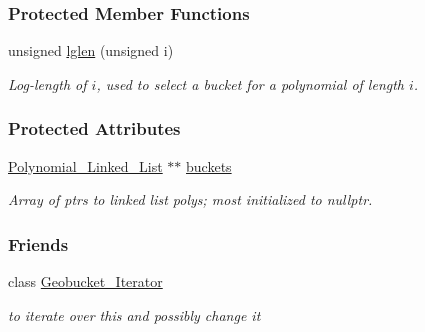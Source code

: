 \subsubsection*{Protected Member Functions}
\begin{DoxyCompactItemize}
\item 
unsigned \hyperlink{group__polygroup_a82e8a9286f5c30e48c13e05d74af7fb9}{lglen} (unsigned i)
\begin{DoxyCompactList}\small\item\em Log-\/length of $i$, used to select a bucket for a polynomial of length $i$. \end{DoxyCompactList}\end{DoxyCompactItemize}
\subsubsection*{Protected Attributes}
\begin{DoxyCompactItemize}
\item 
\mbox{\label{group__polygroup_abfbb6cf257943fb08e03ea4601cf3134}} 
\hyperlink{group__polygroup_class_polynomial___linked___list}{Polynomial\+\_\+\+Linked\+\_\+\+List} $\ast$$\ast$ \hyperlink{group__polygroup_abfbb6cf257943fb08e03ea4601cf3134}{buckets}
\begin{DoxyCompactList}\small\item\em Array of ptrs to linked list polys; most initialized to {\ttfamily nullptr}. \end{DoxyCompactList}\end{DoxyCompactItemize}
\subsubsection*{Friends}
\begin{DoxyCompactItemize}
\item 
\mbox{\label{group__polygroup_a45580077827a8fdbd6d2fabdbb2a2d7f}} 
class \hyperlink{group__polygroup_a45580077827a8fdbd6d2fabdbb2a2d7f}{Geobucket\+\_\+\+Iterator}
\begin{DoxyCompactList}\small\item\em to iterate over {\ttfamily this} and possibly change it \end{DoxyCompactList}\end{DoxyCompactItemize}
